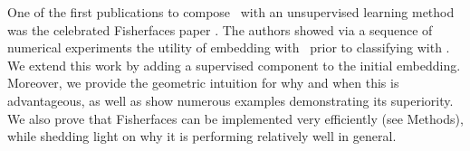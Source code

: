 \documentclass[10pt]{article}
\begin{document}


% 
One of the first publications to compose \Fld~with an unsupervised learning method was the celebrated Fisherfaces paper \cite{Belhumeur1997a}.  The authors showed via a sequence of numerical experiments the utility of embedding with \Pca~prior to classifying with \Fld.  We extend this work by adding a supervised component to the initial embedding.  Moreover, we provide the geometric intuition for why and when this is advantageous, as well as show numerous examples demonstrating its superiority.  %
We also prove that Fisherfaces can be implemented very efficiently (see Methods), while shedding light on why it is performing relatively well in general. 
\end{document}
